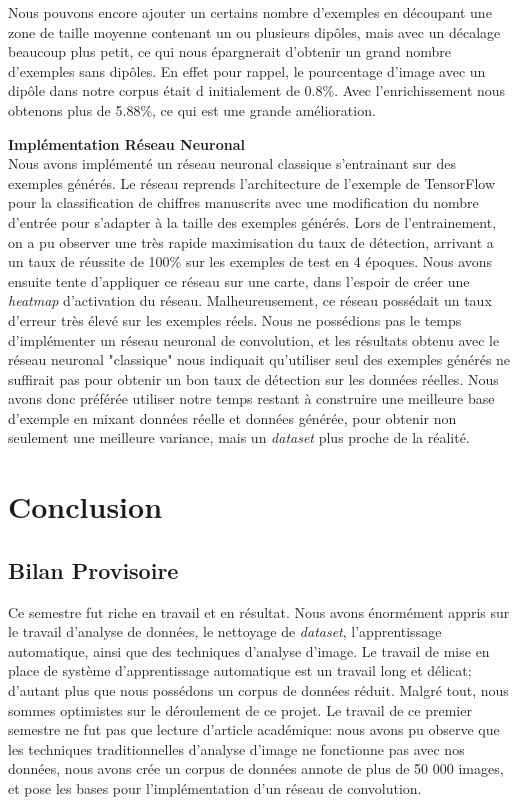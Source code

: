 \documentclass[a4paper, 12pt, titlepage, oneside, french]{article}
\begin{document}
Nous pouvons encore ajouter un certains nombre d'exemples en découpant une zone de taille moyenne contenant un ou plusieurs dipôles, mais avec un décalage beaucoup plus petit, ce qui nous épargnerait d'obtenir un grand nombre d'exemples sans dipôles. En effet pour rappel, le pourcentage d'image avec un dipôle dans notre corpus était d initialement de 0.8\%. Avec l'enrichissement nous obtenons plus de 5.88\%, ce qui est une grande amélioration.

	\textbf{Implémentation Réseau Neuronal}\\
	\indent Nous avons implémenté un réseau neuronal classique s'entrainant sur des exemples générés. Le réseau reprends l'architecture de l'exemple de TensorFlow pour la classification de chiffres manuscrits avec une modification du nombre d'entrée pour s'adapter à la taille des exemples générés. Lors de l'entrainement, on a pu observer une très rapide maximisation du taux de détection, arrivant a un taux de réussite de 100\% sur les exemples de test en 4 époques. Nous avons ensuite tente d'appliquer ce réseau sur une carte, dans l'espoir de créer une \textit{heatmap} d'activation du réseau. Malheureusement, ce réseau possédait un taux d'erreur très élevé sur les exemples réels. Nous ne possédions pas le temps d'implémenter un réseau neuronal de convolution, et les résultats obtenu avec le réseau neuronal "classique" nous indiquait qu'utiliser seul des exemples générés ne suffirait pas pour obtenir un bon taux de détection sur les données réelles. Nous avons donc préférée utiliser notre temps restant à construire une meilleure base d'exemple en mixant données réelle et données générée, pour obtenir non seulement une meilleure variance, mais un \textit{dataset} plus proche de la réalité.
\newpage
\section{Conclusion}
	\subsection{Bilan Provisoire} %
	Ce semestre fut riche en travail et en résultat. Nous avons énormément appris sur le travail d'analyse de données, le nettoyage de \textit{dataset}, l'apprentissage automatique, ainsi que des techniques d'analyse d'image. Le travail de mise en place de système d'apprentissage automatique est un travail long et délicat; d'autant plus que nous possédons un corpus de données réduit. Malgré tout, nous sommes optimistes sur le déroulement de ce projet. Le travail de ce premier semestre ne fut pas que lecture d'article académique: nous avons pu observe que les techniques traditionnelles d'analyse d'image ne fonctionne pas avec nos données, nous avons crée un corpus de données annote de plus de 50 000 images, et pose les bases pour l'implémentation d'un réseau de convolution.
\end{document}
